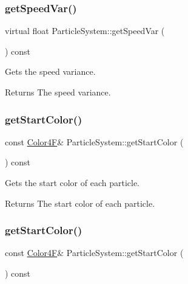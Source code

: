 \subsubsection{\texorpdfstring{get\+Speed\+Var()}{getSpeedVar()}\hspace{0.1cm}{\footnotesize\ttfamily [2/2]}}
{\footnotesize\ttfamily virtual float Particle\+System\+::get\+Speed\+Var (\begin{DoxyParamCaption}{ }\end{DoxyParamCaption}) const\hspace{0.3cm}{\ttfamily [virtual]}}

Gets the speed variance.

\begin{DoxyReturn}{Returns}
The speed variance. 
\end{DoxyReturn}
\mbox{\label{classParticleSystem_ae7a393fb67ce47a73228e0a299604909}} 
\subsubsection{\texorpdfstring{get\+Start\+Color()}{getStartColor()}\hspace{0.1cm}{\footnotesize\ttfamily [1/2]}}
{\footnotesize\ttfamily const \hyperlink{structColor4F}{Color4F}\& Particle\+System\+::get\+Start\+Color (\begin{DoxyParamCaption}{ }\end{DoxyParamCaption}) const\hspace{0.3cm}{\ttfamily [inline]}}

Gets the start color of each particle.

\begin{DoxyReturn}{Returns}
The start color of each particle. 
\end{DoxyReturn}
\mbox{\label{classParticleSystem_ae7a393fb67ce47a73228e0a299604909}} 
\subsubsection{\texorpdfstring{get\+Start\+Color()}{getStartColor()}\hspace{0.1cm}{\footnotesize\ttfamily [2/2]}}
{\footnotesize\ttfamily const \hyperlink{structColor4F}{Color4F}\& Particle\+System\+::get\+Start\+Color (\begin{DoxyParamCaption}{ }\end{DoxyParamCaption}) const\hspace{0.3cm}{\ttfamily [inline]}}

